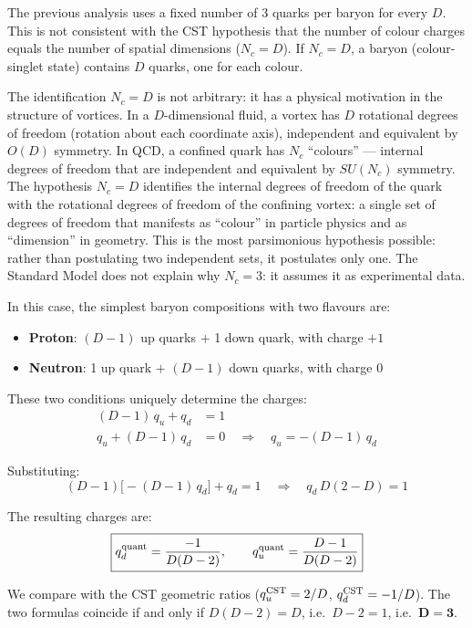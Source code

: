 \documentclass[10pt,a4paper]{article}
\begin{document}
The previous analysis uses a fixed number of 3 quarks per baryon for every $D$. This is not consistent with the CST hypothesis that the number of colour charges equals the number of spatial dimensions ($N_c = D$). If $N_c = D$, a baryon (colour-singlet state) contains $D$ quarks, one for each colour.

The identification $N_c = D$ is not arbitrary: it has a physical motivation in the structure of vortices. In a $D$-dimensional fluid, a vortex has $D$ rotational degrees of freedom (rotation about each coordinate axis), independent and equivalent by $O(D)$ symmetry. In QCD, a confined quark has $N_c$ ``colours'' --- internal degrees of freedom that are independent and equivalent by $SU(N_c)$ symmetry. The hypothesis $N_c = D$ identifies the internal degrees of freedom of the quark with the rotational degrees of freedom of the confining vortex: a single set of degrees of freedom that manifests as ``colour'' in particle physics and as ``dimension'' in geometry. This is the most parsimonious hypothesis possible: rather than postulating two independent sets, it postulates only one. The Standard Model does not explain why $N_c = 3$: it assumes it as experimental data.

In this case, the simplest baryon compositions with two flavours are:
\begin{itemize}
\item \textbf{Proton}: $(D-1)$ up quarks $+$ 1 down quark, with charge $+1$
\item \textbf{Neutron}: 1 up quark $+$ $(D-1)$ down quarks, with charge $0$
\end{itemize}

These two conditions uniquely determine the charges:
\begin{align}
(D-1)\,q_u + q_d &= 1 \\
q_u + (D-1)\,q_d &= 0 \quad \Longrightarrow \quad q_u = -(D-1)\,q_d
\end{align}

Substituting:
\begin{equation}
(D-1)\bigl[-(D-1)\,q_d\bigr] + q_d = 1 \quad \Longrightarrow \quad q_d\,D(2-D) = 1
\end{equation}

The resulting charges are:
\begin{equation}\label{eq:charges_D}
\boxed{q_d^{\rm quant} = \frac{-1}{D(D-2)}, \qquad q_u^{\rm quant} = \frac{D-1}{D(D-2)}}
\end{equation}

We compare with the CST geometric ratios ($q_u^{\rm CST} = 2/D$, $q_d^{\rm CST} = -1/D$). The two formulas coincide if and only if $D(D-2) = D$, i.e.\ $D - 2 = 1$, i.e.\ $\boldsymbol{D = 3}$.
\end{document}
